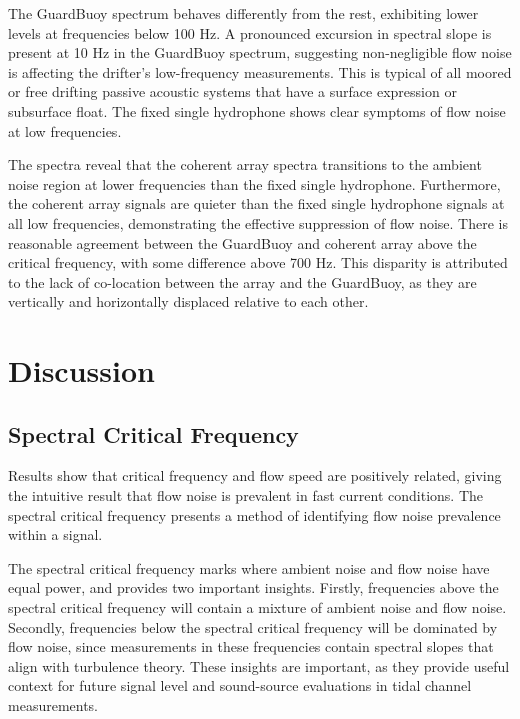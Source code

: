 \documentclass[12pt,journal,onecolumn]{IEEEtran}
\begin{document}
The GuardBuoy spectrum behaves differently from the rest, exhibiting lower levels at frequencies below 100 Hz. A pronounced excursion in spectral slope is present at 10 Hz in the GuardBuoy spectrum, suggesting non-negligible flow noise is affecting the drifter's low-frequency measurements. This is typical of all moored or free drifting passive acoustic systems that have a surface expression or subsurface float. The fixed single hydrophone shows clear symptoms of flow noise at low frequencies. 

The spectra reveal that the coherent array spectra transitions to the ambient noise region at lower frequencies than the fixed single hydrophone. 
Furthermore, the coherent array signals are quieter than the fixed single hydrophone signals at all low frequencies, demonstrating the effective suppression of flow noise. 
There is reasonable agreement between the GuardBuoy and coherent array above the critical frequency, with some difference above 700 Hz. This disparity is attributed to the lack of co-location between the array and the GuardBuoy, as they are vertically and horizontally displaced relative to each other.


\section{Discussion}



\subsection{Spectral Critical Frequency}
Results show that critical frequency and flow speed are positively related, giving the intuitive result that flow noise is prevalent in fast current conditions. 
The spectral critical frequency presents a method of identifying flow noise prevalence within a signal. 

The spectral critical frequency marks where ambient noise and flow noise have equal power, and provides two important insights. Firstly, frequencies above the spectral critical frequency will contain a mixture of ambient noise and flow noise. Secondly, frequencies below the spectral critical frequency will be dominated by flow noise, since measurements in these frequencies contain spectral slopes that align with turbulence theory. These insights are important, as they provide useful context for future signal level and sound-source evaluations in tidal channel measurements. 
\end{document}
